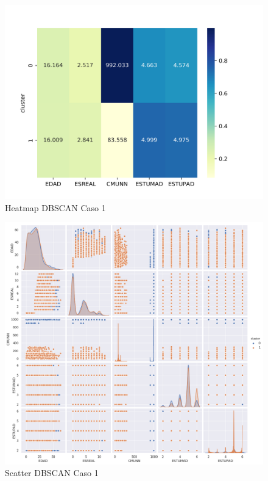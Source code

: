 \begin{figure}[H] %
	\centering
	\includegraphics[scale=0.5]{heatmap-dbscan1.png}  %
	\caption{Heatmap DBSCAN Caso 1} 
	\label{fig:hm-db-caso1}
\end{figure}

\begin{figure}[H] %
	\centering
	\includegraphics[scale=0.37]{dbscan1.png}  %
	\caption{Scatter DBSCAN Caso 1} 
	\label{fig:sc-db-caso1}
\end{figure}

